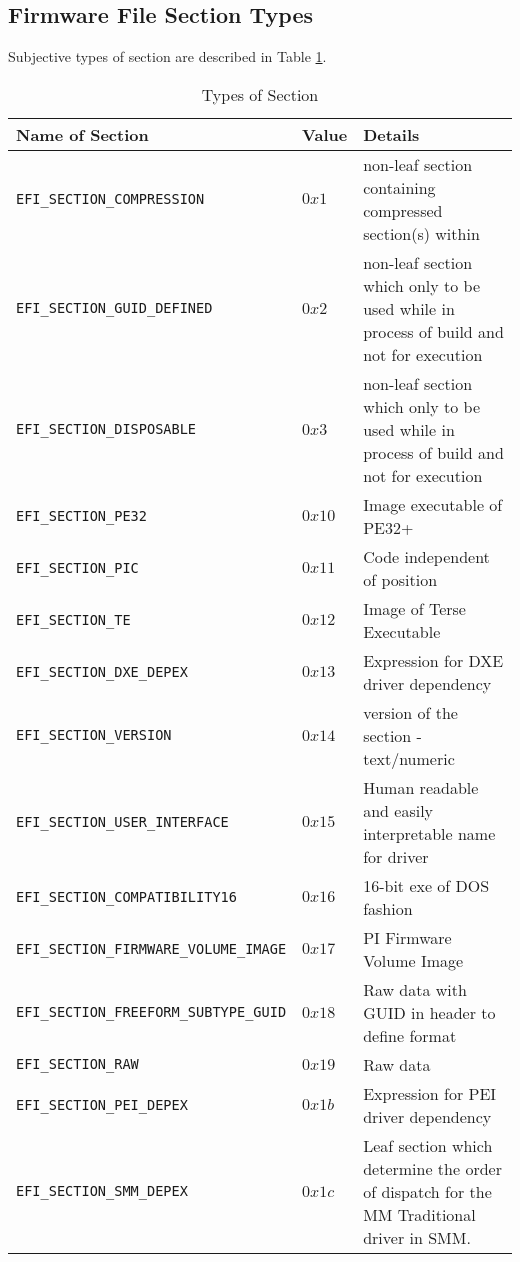 \subsection{Firmware File Section Types}
Subjective types of section are described in Table \ref{table:architectural-section-types}.

\begin{table}[!htbp]
	\centering
	\renewcommand{\arraystretch}{1.2}
	\caption{Types of Section}\label{table:architectural-section-types}
	\begin{tabular}{p{7cm} | l | p{5cm}}
		Name of Section & Value & Details
		\\ \hline \hline
		\verb|EFI_SECTION_COMPRESSION| & $ 0x1 $ & non-leaf section containing compressed section(s) within
		\\ \hline
		\verb|EFI_SECTION_GUID_DEFINED| & $ 0x2 $ & non-leaf section which only to be used while in process of build and not for execution
		\\ \hline
		\verb|EFI_SECTION_DISPOSABLE| & $ 0x3 $ & non-leaf section which only to be used while in process of build and not for execution
		\\ \hline
		\verb|EFI_SECTION_PE32| & $ 0x10 $ & Image executable of PE32+
		\\ \hline
		\verb|EFI_SECTION_PIC| & $ 0x11 $ & Code independent of position
		\\ \hline
		\verb|EFI_SECTION_TE| & $ 0x12 $ & Image of Terse Executable
		\\ \hline
		\verb|EFI_SECTION_DXE_DEPEX| & $ 0x13 $ & Expression for DXE driver dependency
		\\ \hline
		\verb|EFI_SECTION_VERSION| & $ 0x14 $ & version of the section - text/numeric
		\\ \hline
		\verb|EFI_SECTION_USER_INTERFACE| & $ 0x15 $ & Human readable and easily interpretable name for driver
		\\ \hline
		\verb|EFI_SECTION_COMPATIBILITY16| & $ 0x16 $ & 16-bit exe of DOS fashion
		\\ \hline
		\verb|EFI_SECTION_FIRMWARE_VOLUME_IMAGE| & $ 0x17 $ & PI Firmware Volume Image
		\\ \hline
		\verb|EFI_SECTION_FREEFORM_SUBTYPE_GUID| & $ 0x18 $ & Raw data with GUID in header to define format
		\\ \hline
		\verb|EFI_SECTION_RAW| & $ 0x19 $ & Raw data
		\\ \hline
		\verb|EFI_SECTION_PEI_DEPEX| & $ 0x1b $ & Expression for PEI driver dependency
		\\ \hline
		\verb|EFI_SECTION_SMM_DEPEX| & $ 0x1c $ & Leaf section which determine the order of dispatch for the MM Traditional driver in SMM.
		\\ \hline
	\end{tabular}
\end{table}


